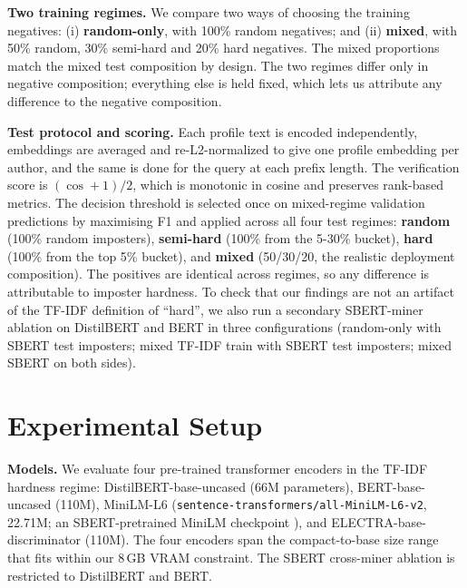 \documentclass[11pt]{article}
\begin{document}
\noindent\textbf{Two training regimes.} We compare two ways of choosing the training negatives: (i) \textbf{random-only}, with 100\% random negatives; and (ii) \textbf{mixed}, with 50\% random, 30\% semi-hard and 20\% hard negatives. The mixed proportions match the mixed test composition by design. The two regimes differ only in negative composition; everything else is held fixed, which lets us attribute any difference to the negative composition.

\noindent\textbf{Test protocol and scoring.} Each profile text is encoded independently, embeddings are averaged and re-L2-normalized to give one profile embedding per author, and the same is done for the query at each prefix length. The verification score is $(\cos+1)/2$, which is monotonic in cosine and preserves rank-based metrics. The decision threshold is selected once on mixed-regime validation predictions by maximising F1 and applied across all four test regimes: \textbf{random} (100\% random imposters), \textbf{semi-hard} (100\% from the 5-30\% bucket), \textbf{hard} (100\% from the top 5\% bucket), and \textbf{mixed} (50/30/20, the realistic deployment composition). The positives are identical across regimes, so any difference is attributable to imposter hardness. To check that our findings are not an artifact of the TF-IDF definition of ``hard'', we also run a secondary SBERT-miner ablation on DistilBERT and BERT in three configurations (random-only with SBERT test imposters; mixed TF-IDF train with SBERT test imposters; mixed SBERT on both sides).

\section{Experimental Setup}
\label{sec:expsetup}

\noindent\textbf{Models.} We evaluate four pre-trained transformer encoders in the TF-IDF hardness regime: DistilBERT-base-uncased \citep{sanh2019distilbert} (66M parameters), BERT-base-uncased \citep{devlin2019bert} (110M), MiniLM-L6 (\texttt{sentence-transformers/all-MiniLM-L6-v2}, 22.71M; an SBERT-pretrained MiniLM checkpoint \citep{reimers2019sentencebert}), and ELECTRA-base-discriminator \citep{clark2020electra} (110M). The four encoders span the compact-to-base size range that fits within our 8\,GB VRAM constraint. The SBERT cross-miner ablation is restricted to DistilBERT and BERT.
\end{document}
